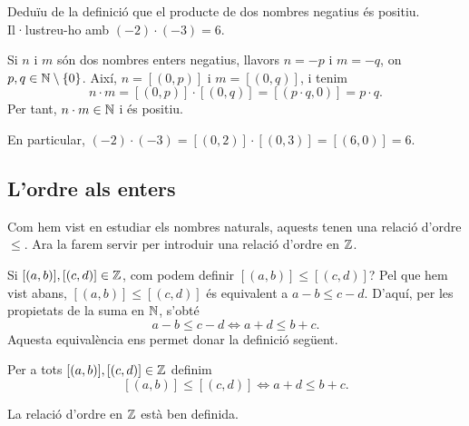 \begin{exemple}
Deduïu de la definició que el producte de dos nombres negatius és positiu. Il·lustreu-ho amb $(-2)\cdot (-3)=6$.
\end{exemple}

\begin{solucio}
Si $n$ i $m$ són dos nombres enters negatius, llavors $n=-p$ i $m=-q$, on $p,q\in \mathbb{N}\setminus \{0\}$. Així, $n=[(0,p)]$ i $m=[(0,q)]$, i tenim
\[
n\cdot m=[(0,p)]\cdot [(0,q)]=[(p\cdot q,0)]=p\cdot q.
\]
Per tant, $n\cdot m\in \mathbb{N}$ i és positiu.

En particular, $(-2)\cdot (-3)=[(0,2)]\cdot [(0,3)]=[(6,0)]=6$.
\end{solucio}

\subsection{L'ordre als enters}

Com hem vist en estudiar els nombres naturals, aquests tenen una relació d'ordre $\leq$. Ara la farem servir per introduir una relació d'ordre en $\mathbb{Z}$.

Si $[(a,b)],[(c,d)]\in \mathbb{Z}$, com podem definir $[(a,b)]\leq [(c,d)]$? Pel que hem vist abans, $[(a,b)]\leq [(c,d)]$ és equivalent a $a-b\leq c-d$. D'aquí, per les propietats de la suma en $\mathbb{N}$, s'obté
\[
a-b\leq c-d \iff a+d\leq b+c.
\]
Aquesta equivalència ens permet donar la definició següent.

\begin{definicio}
Per a tots $[(a,b)],[(c,d)]\in \mathbb{Z}$ definim
\[
[(a,b)]\leq [(c,d)] \iff a+d\leq b+c.
\]
\end{definicio}

\begin{proposicio}
La relació d'ordre en $\mathbb{Z}$ està ben definida.
\end{proposicio}

